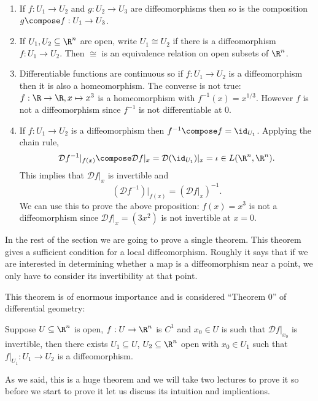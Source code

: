 \documentclass[a4paper]{article}
\newcommand*{\D}{\mathcal{D}}
\theoremstyle{definition}
\begin{document}
\begin{remark}\leavevmode
  \begin{enumerate}
  \item If \(f: U_1 \to U_2\) and \(g: U_2 \to U_3\) are diffeomorphisms then so is the composition \(g \compose f: U_1 \to U_3\).
  \item If \(U_1, U_2 \subseteq \R^n\) are open, write \(U_1 \cong U_2\) if there is a diffeomorphism \(f: U_1 \to U_2\). Then \(\cong\) is an equivalence relation on open subsets of \(\R^n\).
  \item Differentiable functions are continuous so if \(f: U_1 \to U_2\) is a diffeomorphism then it is also a homeomorphism. The converse is not true: \(f: \R \to \R, x \mapsto x^3\) is a homeomorphism with \(f^{-1}(x) = x^{1/3}\). However \(f\) is not a diffeomorphism since \(f^{-1}\) is not differentiable at \(0\).
  \item If \(f: U_1 \to U_2\) is a diffeomorphism then \(f^{-1} \compose f = \id_{U_1}\). Applying the chain rule,
    \[
      \D f^{-1}|_{f(x)} \compose \D f|_x = \D (\id_{U_1})|_x = \iota \in L(\R^n, \R^n).
    \]
    This implies that \(\D f|_x\) is invertible and
    \[
      (\D f^{-1})|_{f(x)} = (\D f|_x)^{-1}.
    \]
    We can use this to prove the above proposition: \(f(x) = x^3\) is not a diffeomorphism since \(\D f|_x = (3x^2)\) is not invertible at \(x = 0\).
  \end{enumerate}
\end{remark}

In the rest of the section we are going to prove a single theorem. This theorem gives a sufficient condition for a local diffeomorphism. Roughly it says that if we are interested in determining whether a map is a diffeomorphism near a point, we only have to consider its invertibility at that point.

This theorem is of enormous importance and is considered ``Theorem \(0\)'' of differential geometry:

\begin{theorem}
  \label{thm:inverse function}
  Suppose \(U \subseteq \R^n\) is open, \(f: U \to \R^n\) is \(C^1\) and \(x_0 \in U\) is such that \(\D f|_{x_0}\) is invertible, then there exists \(U_1 \subseteq U\), \(U_2 \subseteq \R^n\) open with \(x_0 \in U_1\) such that \(f|_{U_1}: U_1 \to U_2\) is a diffeomorphism.
\end{theorem}

As we said, this is a huge theorem and we will take two lectures to prove it so before we start to prove it let us discuss its intuition and implications.
\end{document}
